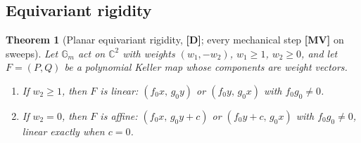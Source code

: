 \documentclass[11pt]{article}
\newtheorem{theorem}{Theorem}[section]
\theoremstyle{definition}
\theoremstyle{remark}
\newcommand{\C}{\mathbb{C}}
\newcommand{\Gm}{\mathbb{G}_m}
\newcommand{\MV}{\textbf{[MV]}}
\newcommand{\DD}{\textbf{[D]}}
\begin{document}
\subsection{Equivariant rigidity}\label{sec:rigidity}

\begin{theorem}[Planar equivariant rigidity, {\DD}; every mechanical step {\MV} on sweeps]\label{thm:rigidity}
Let $\Gm$ act on $\C^2$ with weights $(w_1, -w_2)$, $w_1 \ge 1$, $w_2 \ge 0$, and let $F = (P,Q)$ be a polynomial Keller map whose components are weight vectors.
\begin{enumerate}
\item If $w_2 \ge 1$, then $F$ is linear: $(f_0 x,\, g_0 y)$ or $(f_0 y,\, g_0 x)$ with $f_0 g_0 \neq 0$.
\item If $w_2 = 0$, then $F$ is affine: $(f_0 x,\, g_0 y + c)$ or $(f_0 y + c,\, g_0 x)$ with $f_0 g_0 \ne 0$, linear exactly when $c = 0$.
\end{enumerate}
\end{theorem}
\end{document}
